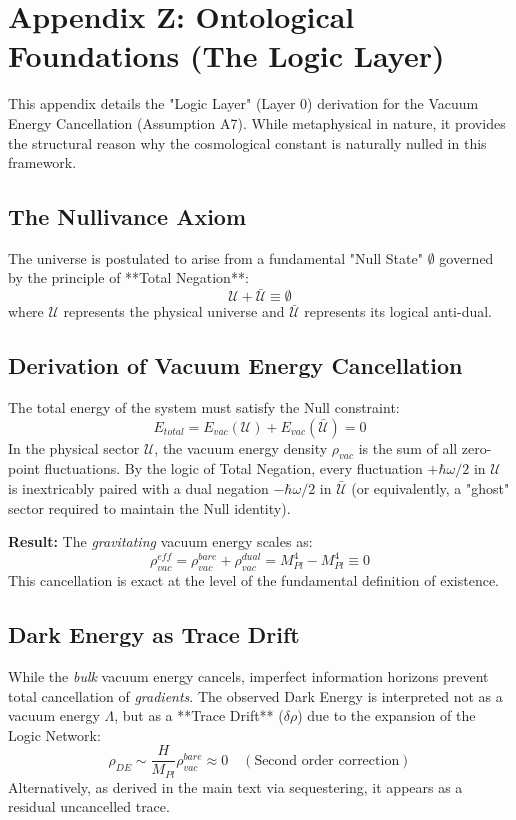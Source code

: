 \section{Appendix Z: Ontological Foundations (The Logic Layer)}

This appendix details the "Logic Layer" (Layer 0) derivation for the Vacuum Energy Cancellation (Assumption A7). While metaphysical in nature, it provides the structural reason why the cosmological constant is naturally nulled in this framework.

\subsection{The Nullivance Axiom}
The universe is postulated to arise from a fundamental "Null State" $\emptyset$ governed by the principle of **Total Negation**:
\begin{equation}
    \mathcal{U} + \bar{\mathcal{U}} \equiv \emptyset
\end{equation}
where $\mathcal{U}$ represents the physical universe and $\bar{\mathcal{U}}$ represents its logical anti-dual. 

\subsection{Derivation of Vacuum Energy Cancellation}
The total energy of the system must satisfy the Null constraint:
\begin{equation}
    E_{total} = E_{vac}(\mathcal{U}) + E_{vac}(\bar{\mathcal{U}}) = 0
\end{equation}
In the physical sector $\mathcal{U}$, the vacuum energy density $\rho_{vac}$ is the sum of all zero-point fluctuations. By the logic of Total Negation, every fluctuation $+\hbar\omega/2$ in $\mathcal{U}$ is inextricably paired with a dual negation $-\hbar\omega/2$ in $\bar{\mathcal{U}}$ (or equivalently, a "ghost" sector required to maintain the Null identity).

\textbf{Result:} The \emph{gravitating} vacuum energy scales as:
\begin{equation}
    \rho_{vac}^{eff} = \rho_{vac}^{bare} + \rho_{vac}^{dual} = M_{Pl}^4 - M_{Pl}^4 \equiv 0
\end{equation}
This cancellation is exact at the level of the fundamental definition of existence.

\subsection{Dark Energy as Trace Drift}
While the \emph{bulk} vacuum energy cancels, imperfect information horizons prevent total cancellation of \emph{gradients}. The observed Dark Energy is interpreted not as a vacuum energy $\Lambda$, but as a **Trace Drift** ($\delta \rho$) due to the expansion of the Logic Network:
\begin{equation}
    \rho_{DE} \sim \frac{H}{M_{Pl}} \rho_{vac}^{bare} \approx 0 \quad (\text{Second order correction})
\end{equation}
Alternatively, as derived in the main text via sequestering, it appears as a residual uncancelled trace.

